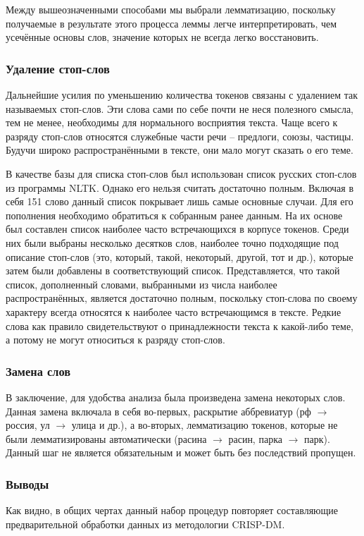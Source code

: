 Между вышеозначенными способами мы выбрали лемматизацию, поскольку получаемые в результате этого процесса леммы легче интерпретировать, чем усечённые основы слов, значение которых не всегда легко восстановить.

\subsubsection{Удаление стоп-слов}
Дальнейшие усилия по уменьшению количества токенов связаны с удалением так называемых стоп-слов. Эти слова сами по себе почти не неся полезного смысла, тем не менее, необходимы для нормального восприятия текста. Чаще всего к разряду стоп-слов относятся служебные части речи -- предлоги, союзы, частицы. Будучи широко распространёнными в тексте, они мало могут сказать о его теме.

В качестве базы для списка стоп-слов был использован список русских стоп-слов из программы NLTK. Однако его нельзя считать достаточно полным. Включая в себя 151 слово данный список покрывает лишь самые основные случаи. Для его пополнения необходимо обратиться к собранным ранее данным. На их основе был составлен список наиболее часто встречающихся в корпусе токенов. Среди них были выбраны несколько десятков слов, наиболее точно подходящие под описание стоп-слов (это, который, такой, некоторый, другой, тот и др.), которые затем были добавлены в соответствующий список. Представляется, что такой список, дополненный словами, выбранными из числа наиболее распространённых, является достаточно полным, поскольку стоп-слова по своему характеру всегда относятся к наиболее часто встречающимся в тексте. Редкие слова как правило свидетельствуют о принадлежности текста к какой-либо теме, а потому не могут относиться к разряду стоп-слов.

\subsubsection{Замена слов}
В заключение, для удобства анализа была произведена замена некоторых слов. Данная замена включала в себя во-первых, раскрытие аббревиатур (рф $\to$ россия, ул $\to$ улица и др.), а во-вторых, лемматизацию токенов, которые не были лемматизированы автоматически (расина $\to$ расин, парка $\to$ парк). Данный шаг не является обязательным и может быть без последствий пропущен.

\subsubsection{Выводы}
Как видно, в общих чертах данный набор процедур повторяет составляющие предварительной обработки данных из методологии CRISP-DM.

